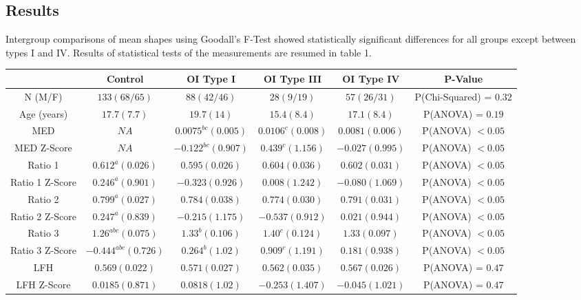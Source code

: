 \documentclass[a0,portrait]{a0poster}
\begin{document}
\begin{multicols}{2}
\section{Results} 
Intergroup comparisons of mean shapes using Goodall's F-Test showed statistically significant differences for all groups except between types I and IV.
Results of statistical tests of the measurements are resumed in table 1.\\

\begin{tabular}{|c||c|c|c|c|c|}
\hline
 & Control & OI Type I & OI Type III & OI Type IV & P-Value\\
\hline
\hline
	N (M/F) & $133 (68/65)$ & $88 (42/46)$ & $28 (9/19)$ & $57 (26/31)$ &
	P(Chi-Squared) = $0.32$\\
	Age (years) & $17.7 (7.7)$ & $19.7 (14)$ & $15.4 (8.4)$ & $17.1 (8.4)$ & P(ANOVA) =
	$0.19$\\
	MED & $NA$ & $0.0075^{bc} (0.005)$ & $0.0106^{c} (0.008)$ & $0.0081 (0.006)$ &
	P(ANOVA)  $<0.05$\\
	MED Z-Score & $NA$ & $-0.122^{bc} (0.907)$ & $0.439^{c} (1.156)$ & $-0.027
	(0.995)$ & P(ANOVA) $<0.05$\\
	Ratio 1 & $0.612^{a} (0.026)$ & $0.595 (0.026)$ & $0.604 (0.036)$ & $0.602
	(0.031)$ & P(ANOVA) $<0.05$\\
	Ratio 1 Z-Score & $0.246^{a} (0.901)$ & $-0.323 (0.926)$ & $0.008 (1.242)$ &
	$-0.080 (1.069)$ & P(ANOVA) $<0.05$\\
	Ratio 2 & $0.799^{a} (0.027)$ & $0.784 (0.038)$ & $0.774 (0.030)$ & $0.791
	(0.031)$ & P(ANOVA) $<0.05$\\
	Ratio 2 Z-Score & $0.247^{a} (0.839)$ & $-0.215 (1.175)$ & $-0.537 (0.912)$ &
	$0.021 (0.944)$ & P(ANOVA) $<0.05$\\
	Ratio 3 & $1.26^{abc} (0.075)$ & $1.33^{b} (0.106)$ & $1.40^{c} (0.124)$ &
	$1.33 (0.097)$ & P(ANOVA) $<0.05$\\
	Ratio 3 Z-Score & $-0.444^{abc} (0.726)$ & $0.264^{b} (1.02)$ & $0.909^{c}
	(1.191)$ & $0.181 (0.938)$ & P(ANOVA) $<0.05$\\
	LFH & $0.569 (0.022)$ & $0.571 (0.027)$ & $0.562 (0.035)$ & $0.567 (0.026)$ &
	P(ANOVA) = $0.47$ \\
	LFH Z-Score & $0.0185 (0.871)$ & $0.0818 (1.02)$ & $-0.253 (1.407)$ &
	$-0.045 (1.021)$ & P(ANOVA) = $0.47$\\
\hline
\end{tabular}


\end{multicols}
\end{document}
